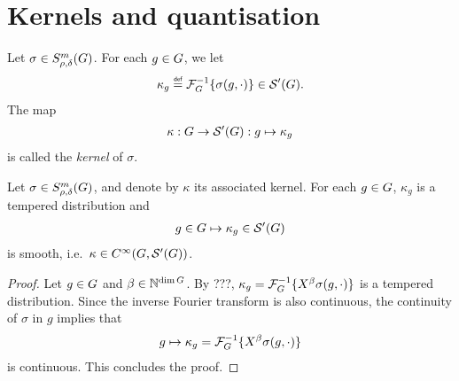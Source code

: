\section{Kernels and quantisation}

\begin{definition}
\label{definition:kernel_of_symbol}
    Let $\sigma \in S^{m}_{\rho, \delta}(G)$.
    For each $g \in G$, we let
    \begin{align*}
        \kappa_g \defeq \InverseFourier\{\sigma(g, \dummy)\} \in \TemperedDistributions\Group.
    \end{align*}
    The map
    \begin{align*}
        \kappa : G \to {\mathcal{S}' (G)} : g \mapsto \kappa_g
    \end{align*}
    is called the \emph{kernel} of $\sigma$.
\end{definition}

\begin{lemma}
    Let $\sigma \in S^{m}_{\rho, \delta}(G)$,
    and denote by $\kappa$ its associated kernel.
    For each $g \in G$,
    $\kappa_g$ is a tempered distribution and
    \begin{align*}
        g \in G \mapsto \kappa_g \in {\mathcal{S}' (G)}
    \end{align*}
    is smooth,
    i.e.\ $\kappa \in {C^\infty(G, {\mathcal{S}' (G)})}$.
\end{lemma}
\begin{proof}
    Let $g \in G$ and $\beta \in \mathbb{N}^{\dim G}$.
    By ???, $\kappa_g = \InverseFourier \{\LeftDifferentialOperator \beta \sigma(g, \dummy)\}$ is a tempered distribution.
    Since the inverse Fourier transform is also continuous,
    the continuity of $\sigma$ in $g$ implies that
    \begin{align*}
        g \mapsto \kappa_g = \InverseFourier \{\LeftDifferentialOperator \beta \sigma(g, \dummy)\}
    \end{align*}
    is continuous.
    This concludes the proof.
\end{proof}

